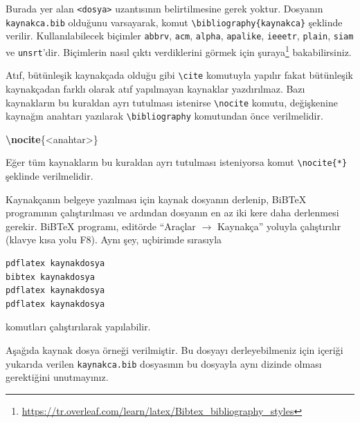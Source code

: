 \documentclass[
  10pt,
]{scrbook}
\newenvironment{Shaded}{\begin{snugshade}}{\end{snugshade}}
\newcommand{\ExtensionTok}[1]{#1}
\newcommand{\KeywordTok}[1]{\textcolor[rgb]{0.13,0.29,0.53}{\textbf{#1}}}
\newcommand{\NormalTok}[1]{#1}
\renewcommand{\href}[2]{#2\footnote{\url{#1}}}
\theoremstyle{definition}
\theoremstyle{definition}
\theoremstyle{definition}
\theoremstyle{definition}
\theoremstyle{remark}
\begin{document}
Burada yer alan \texttt{\textless{}dosya\textgreater{}} uzantısının belirtilmesine gerek yoktur.
Dosyanın \texttt{kaynakca.bib} olduğunu varsayarak, komut
\texttt{\textbackslash{}bibliography\{kaynakca\}} şeklinde verilir. Kullanılabilecek biçimler
\texttt{abbrv}, \texttt{acm}, \texttt{alpha}, \texttt{apalike}, \texttt{ieeetr}, \texttt{plain}, \texttt{siam} ve
\texttt{unsrt}'dir. Biçimlerin nasıl çıktı verdiklerini görmek için \href{https://tr.overleaf.com/learn/latex/Bibtex_bibliography_styles}{şuraya}
bakabilirsiniz.

Atıf, bütünleşik kaynakçada olduğu gibi \texttt{\textbackslash{}cite} komutuyla yapılır fakat
bütünleşik kaynakçadan farklı olarak atıf yapılmayan kaynaklar
yazdırılmaz. Bazı kaynakların bu kuraldan ayrı tutulması istenirse
\texttt{\textbackslash{}nocite} komutu, değişkenine kaynağın anahtarı yazılarak
\texttt{\textbackslash{}bibliography} komutundan önce verilmelidir.

\begin{Shaded}
\begin{Highlighting}[]
\KeywordTok{\textbackslash{}nocite}\NormalTok{\{}\ExtensionTok{\textless{}anahtar\textgreater{}}\NormalTok{\}}
\end{Highlighting}
\end{Shaded}

Eğer tüm kaynakların bu kuraldan ayrı tutulması isteniyorsa komut
\texttt{\textbackslash{}nocite\{*\}} şeklinde verilmelidir.

Kaynakçanın belgeye yazılması için kaynak dosyanın derlenip, BiBTeX
programının çalıştırılması ve ardından dosyanın en az iki kere daha
derlenmesi gerekir. BiBTeX programı, editörde ``Araçlar \(\rightarrow\) Kaynakça'' yoluyla çalıştırılır (klavye kısa yolu F8). Aynı şey,
uçbirimde sırasıyla

\begin{verbatim}
pdflatex kaynakdosya
bibtex kaynakdosya
pdflatex kaynakdosya
pdflatex kaynakdosya
\end{verbatim}

komutları çalıştırılarak yapılabilir.

Aşağıda kaynak dosya örneği verilmiştir. Bu dosyayı derleyebilmeniz için içeriği yukarıda verilen \texttt{kaynakca.bib} dosyasının bu dosyayla aynı dizinde olması gerektiğini unutmayınız.
\end{document}
